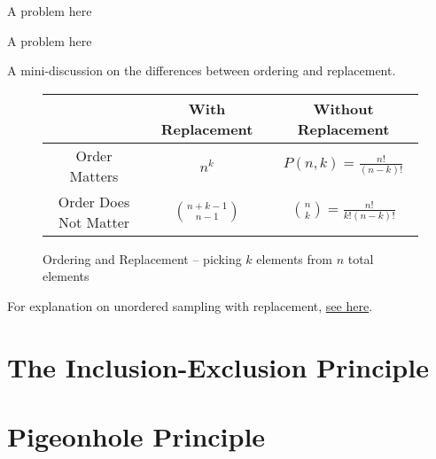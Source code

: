\documentclass[main.tex]{subfiles}
\begin{document}
\begin{defn}
	
\end{defn}

\begin{example}
	A problem here
\end{example}

\begin{defn}
	
\end{defn}

\begin{example}
	A problem here
\end{example}

A mini-discussion on the differences between ordering and replacement.

\begin{figure}[H]
	\centering
	\begin{tabular}{ccc}
		& With Replacement & Without Replacement \\
		\midrule
		Order Matters & \(n^k\) & \(P(n,k) = \frac{n!}{(n-k)!}\) \\
		\midrule
		Order Does Not Matter & \(\binom{n+k-1}{n-1}\) & \(\binom{n}{k} = \frac{n!}{k!(n-k)!}\) \\
	\end{tabular}
	\caption{Ordering and Replacement -- picking \(k\) elements from \(n\) total elements}
\end{figure}

\begin{rem}
	For explanation on unordered sampling with replacement, \href{https://www.probabilitycourse.com/chapter2/2_1_4_unordered_with_replacement.php}{see here}.
\end{rem}

\section{The Inclusion-Exclusion Principle}

\begin{thm}
	
\end{thm}



\section{Pigeonhole Principle}
\end{document}
